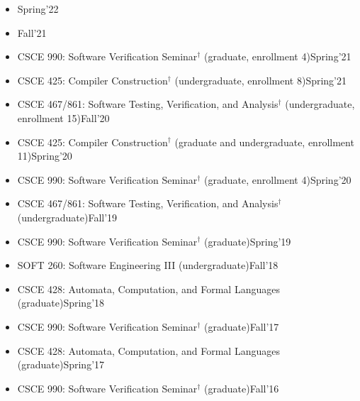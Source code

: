 \documentclass[11pt]{article}
\newcommand{\beforegmu}{\begin{center}\rule{2in}{0.8pt}~\textbf{Before GMU}~\rule{2in}{0.8pt}\end{center}}
\begin{document}
\begin{itemize}
    \item {}\hfill Spring'22

  \item {}\hfill Fall'21
    
\end{itemize}


\begin{itemize}
    \item CSCE 990: Software Verification Seminar$^{\dagger}$ (graduate, enrollment 4)\hfill Spring'21
    \item CSCE 425: Compiler Construction$^{\dagger}$ (undergraduate, enrollment 8)\hfill Spring'21
    \item CSCE 467/861: Software Testing, Verification, and Analysis$^{\dagger}$ (undergraduate, enrollment 15)\hfill Fall'20
    \item CSCE 425: Compiler Construction$^{\dagger}$ (graduate and undergraduate, enrollment 11)\hfill Spring'20
    \item CSCE 990: Software Verification Seminar$^{\dagger}$ (graduate, enrollment 4)\hfill Spring'20
    \item CSCE 467/861: Software Testing, Verification, and Analysis$^{\dagger}$ (undergraduate)\hfill Fall'19
    \item CSCE 990: Software Verification Seminar$^{\dagger}$ (graduate)\hfill Spring'19
    \item SOFT 260: Software Engineering III (undergraduate)\hfill Fall'18
    \item CSCE 428: Automata, Computation, and Formal Languages (graduate)\hfill Spring'18
    \item CSCE 990: Software Verification Seminar$^{\dagger}$ (graduate)\hfill Fall'17
    \item CSCE 428: Automata, Computation, and Formal Languages (graduate)\hfill Spring'17
    \item CSCE 990: Software Verification Seminar$^{\dagger}$ (graduate)\hfill Fall'16
\end{itemize}
\end{document}
